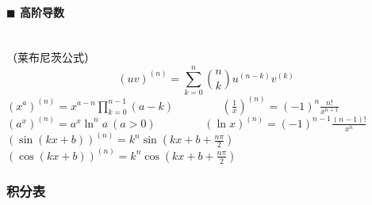 \paragraph{$\blacksquare$ 高阶导数}
\noindent \\
（莱布尼茨公式）
$$(uv)^{(n)}=\sum _{{k=0}}^{n}{\binom{n}{k} u^{(n-k)} v^{(k)}}$$
${\displaystyle (x^a)^{(n)}=x^{a-n} \prod _{{k=0}}^{{n-1}} (a-k)}$~~~~~~~~
$(\frac{1}{x})^{(n)}=(-1)^n\frac{n!}{x^{n+1}}$\\
$(a^x)^{(n)}=a^x \ln ^n a~(a>0)$~~~~~~~~
$(\ln x)^{(n)}=(-1)^{n-1} \frac{(n-1)!}{x^n}$\\
$(\sin (kx+b))^{(n)}=k^n \sin (kx+b+\frac{n\pi}{2})$~~~~
$(\cos (kx+b))^{(n)}=k^n \cos (kx+b+\frac{n\pi}{2})$
\subsubsection{积分表}

